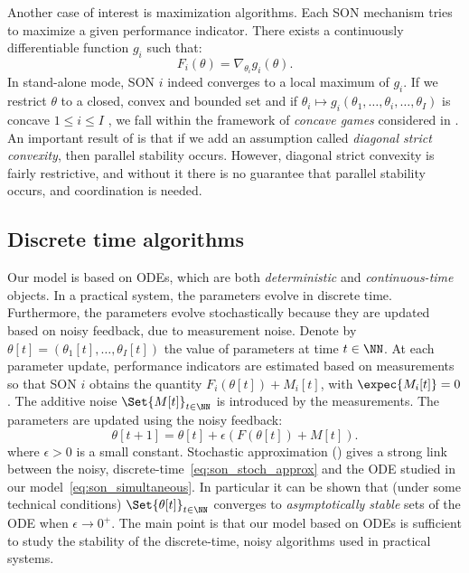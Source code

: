 \documentclass[10pt,conference,letterpaper]{IEEEtran}
\begin{document}
	Another case of interest is maximization algorithms. Each \ac{SON} mechanism tries to maximize a given performance indicator. There exists a continuously differentiable function $g_i$ such that:
\begin{equation}\label{eq:son_maximize}
	F_i(\theta) =  \nabla_{\theta_i} g_i(\theta).
\end{equation}
	In stand-alone mode, \ac{SON} $i$ indeed converges to a local maximum of $g_i$. If we restrict $\theta$ to a closed, convex and bounded set and if $\theta_i \mapsto g_i(\theta_1,\dotsc,\theta_i,\dotsc,\theta_I)$ is concave $1 \leq i \leq I$ , we fall within the framework of \emph{concave games} considered in \cite{RosenConvexGame}. An important result of \cite{RosenConvexGame} is that if we add an assumption called \emph{diagonal strict convexity}, then parallel stability occurs. However, diagonal strict convexity is fairly restrictive, and without it there is no guarantee that parallel stability occurs, and coordination is needed.
\subsection{Discrete time algorithms}
	Our model is based on \acp{ODE}, which are both \emph{deterministic} and \emph{continuous-time} objects. In a practical system, the parameters evolve in discrete time. Furthermore, the parameters evolve stochastically because they are updated based on noisy feedback, due to measurement noise. Denote by $\theta[t] = (\theta_1[t], \dotsc, \theta_I[t])$ the value of parameters at time $t \in \NN$. At each parameter update, performance indicators are estimated based on measurements so that \ac{SON} $i$ obtains the quantity $F_i(\theta[t]) + M_i[t]$, with $\expec{M_i[t]} = 0$. The additive noise $\Set{M[t]}_{t \in \NN}$ is introduced by the measurements. The parameters are updated using the noisy feedback:
\begin{equation}\label{eq:son_stoch_approx}
	\theta[t+1] = \theta[t] + \epsilon (F(\theta[t]) + M[t]).
\end{equation}
where $\epsilon > 0$ is a small constant.	Stochastic approximation (\cite{Kushner,Borkar}) gives a strong link between the noisy, discrete-time~\eqref{eq:son_stoch_approx} and the \ac{ODE} studied in our model~\eqref{eq:son_simultaneous}. In particular it can be shown that (under some technical conditions) $\Set{\theta[t]}_{t \in \NN}$ converges to \emph{asymptotically stable} sets of the \ac{ODE} when $\epsilon \to 0^+$. The main point is that our model based on \acp{ODE} is sufficient to study the stability of the discrete-time, noisy algorithms used in practical systems. 
\end{document}
